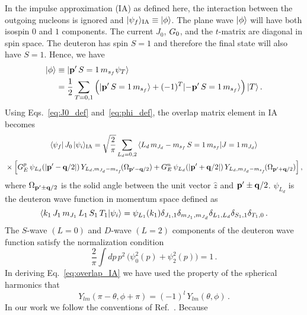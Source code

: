 	In the impulse approximation (IA) as defined here, the interaction between the
	outgoing nucleons is ignored and $|\psi_f \rangle_{\rm IA} \equiv | \phi \rangle$.
	The plane wave $|\phi\rangle$ will have both isospin $0$ and $1$ components.
	The current $J_0$, $G_0$, and the $t$-matrix are diagonal in spin space.
	The deuteron has spin $S=1$ and therefore the final state will also have
	$S=1$. 	Hence, we have
	\begin{eqnarray}
	 {|\phi\rangle} &\equiv {|\mathbf{p^\prime}\, S=1 \, m_{s_f}\psi_T\rangle} \nonumber \\
	 &= \frac{1}{2} \sum_{T = 0,1}
	 \Big({|\mathbf{p^\prime} \, S=1 \, m_{s_f}\rangle}
		+ (-1)^T {|{-}\mathbf{p^\prime} \, S=1 \, m_{s_f}\rangle} \Big) \,{|T\rangle} \,.
	\label{eq:phi_def}
	\end{eqnarray}
	Using Eqs.~\eqref{eq:J0_def} and~\eqref{eq:phi_def}, the overlap matrix
	element	in IA becomes
	\begin{multline}
	 \la \psi_f | \, J_0 \, |\psi_i \ra_{\rm IA}
	 = \sqrt{\frac{2}{\pi}} \sum_{L_{d} = 0, 2}
	 \CG{L_d}{\mJd - \msf}{S=1}{\msf}{J=1}{\mJd} \\
	 \null \times \Big[
	  G_E^p \, \psi_{L_d}(|\mbf{\pp} - \mbf{q}/2|)
	  \,Y_{L_d,\mJd-m_{s_f}}\!(\Omega_{\mbf{\pp} - \mbf{q}/2})
	  + G_E^n \, \psi_{L_d}(|\mbf{\pp} + \mbf{q}/2|)
	  \,Y_{L_d,\mJd-m_{s_f}}\!(\Omega_{\mbf{\pp} + \mbf{q}/2})
	 \Big] \,,
	\label{eq:overlap_IA}
	\end{multline}
	where $\Omega_{\mathbf{p^\prime} \pm \mathbf{q}/2}$ is the solid angle between the
	unit vector $\hat{z}$ and $\mathbf{p^\prime}\pm\mathbf{q}/2$.  $\psi_{L_d}$ is the
	deuteron wave function in momentum space defined as
	\begin{equation}
	 {\langle k_1 \, J_1 \, m_{J_1} \, L_1 \, S_1 \, T_1|\psi_i\rangle}
	 = \psi_{L_1}(k_1)
	  \delta_{J_1,1}\delta_{m_{J_1},m_{J_d}}
	 \delta_{L_1,L_d}\delta_{S_1,1}\delta_{T_1,0} \,.
  \end{equation}
	The $S$-wave $(L=0)$ and $D$-wave $(L=2)$ components of the deuteron wave
	function satisfy the normalization condition
	\begin{equation}
	 \frac{2}{\pi} \int dp \, p^2 \, \big(\psi_0^2(p) + \psi_2^2(p)\big) = 1 \,.
	\end{equation}
	In deriving Eq.~\eqref{eq:overlap_IA} we have used the property of the
	spherical harmonics that
	\begin{equation}
	 Y_{lm}(\pi-\theta,\phi+\pi) = (-1)^l \, Y_{lm}(\theta,\phi) \,.
	\end{equation}
	In our work we follow the conventions of Ref.~\cite{Landau:1989}.  Because
